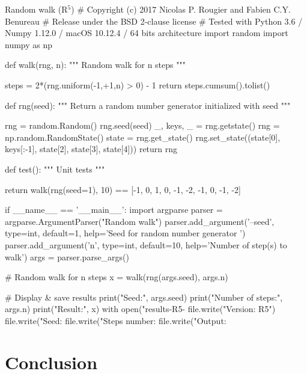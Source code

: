 \documentclass[a4paper,11pt]{article}
\begin{document}
\begin{code}{Random walk (R$^5$)}
# Copyright (c) 2017 Nicolas P. Rougier and Fabien C.Y. Benureau
# Release under the BSD 2-clause license
# Tested with Python 3.6 / Numpy 1.12.0 / macOS 10.12.4 / 64 bits architecture
import random
import numpy as np

def walk(rng, n):
    """ Random walk for n steps """

    steps = 2*(rng.uniform(-1,+1,n) > 0) - 1
    return steps.cumsum().tolist()

def rng(seed):
    """ Return a random number generator initialized with seed """ 
    
    rng = random.Random()
    rng.seed(seed)
    _, keys, _ = rng.getstate()
    rng = np.random.RandomState()
    state = rng.get_state()
    rng.set_state((state[0], keys[:-1], state[2], state[3], state[4]))
    return rng

def test():
    """ Unit tests """

    return walk(rng(seed=1), 10) == [-1, 0, 1, 0, -1, -2, -1, 0, -1, -2]

if __name__ == '__main__':
    import argparse
    parser = argparse.ArgumentParser("Random walk")
    parser.add_argument('--seed', type=int, default=1,
                        help='Seed for random number generator ')
    parser.add_argument('n', type=int, default=10,
                        help='Number of step(s) to walk')
    args = parser.parse_args()

    # Random walk for n steps
    x = walk(rng(args.seed), args.n)

    # Display & save results
    print("Seed:", args.seed)
    print("Number of steps:", args.n)
    print("Result:",  x)
    with open("results-R5-%
        file.write("Version: R5")
        file.write("Seed: %
        file.write("Steps number: %
        file.write("Output: %
\end{code}




\clearpage
\section*{Conclusion}


\renewcommand*{\bibfont}{\small}
\printbibliography[title=References]
\end{document}
